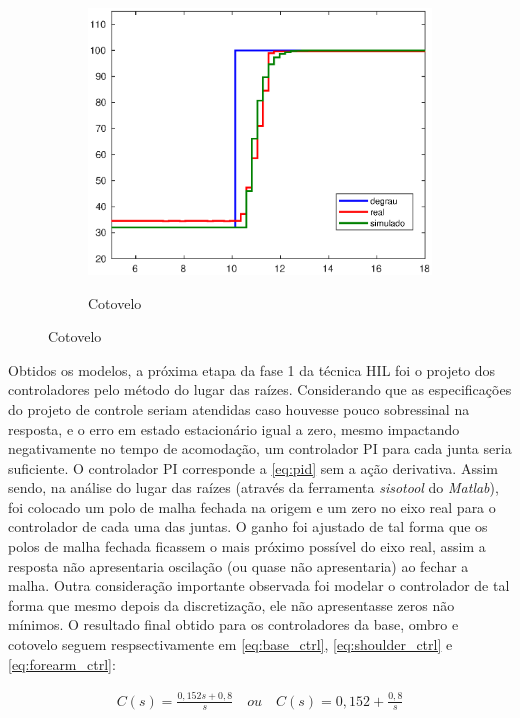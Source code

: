 \begin{figure}[h!]
\begin{subfigure}{.5\textwidth}
    \label{fig:shoulder_ma_simul}
  \end{subfigure}%
  \\[5ex]
  \begin{subfigure}{\textwidth}
    \centering
    \caption{Cotovelo}
    \includegraphics[width = 0.55\columnwidth]{Imagens/forearm_ma_simul}
    \label{fig:forearm_ma_simul}
  \end{subfigure}%
  
  \label{fig:ensaioMalhaAbertaSimul} 

\end{figure}

Obtidos os modelos, a próxima etapa da fase 1 da técnica HIL foi o projeto dos 
controladores pelo método do lugar das raízes. Considerando que as especificações do projeto
de controle seriam atendidas caso houvesse pouco sobressinal na resposta, e o erro em estado
estacionário igual a zero, mesmo impactando negativamente no tempo de acomodação, um controlador 
PI para cada junta seria suficiente. O controlador PI corresponde a \autoref{eq:pid} sem a ação 
derivativa. Assim sendo, na análise do lugar das
raízes (através da ferramenta \textit{sisotool} do \textit{Matlab}), foi colocado um polo de malha
fechada na origem e um zero no eixo real para o controlador de cada uma das juntas. O ganho foi 
ajustado de tal forma que os polos de malha fechada ficassem o mais próximo possível do eixo real, 
assim a resposta não apresentaria oscilação (ou quase não apresentaria) ao fechar a malha. Outra 
consideração importante observada foi modelar o controlador de tal forma que mesmo depois da 
discretização, ele não apresentasse zeros não mínimos. O resultado final obtido para os controladores 
da base, ombro e cotovelo seguem respsectivamente em \eqref{eq:base_ctrl}, \eqref{eq:shoulder_ctrl}
e \eqref{eq:forearm_ctrl}:

\begin{equation}
  \begin{gathered}
    C(s) = \frac{0,152s + 0,8}{s} \quad ou \quad C(s) = 0,152 + \frac{0,8}{s}
  \end{gathered}
  \label{eq:base_ctrl}
\end{equation}

